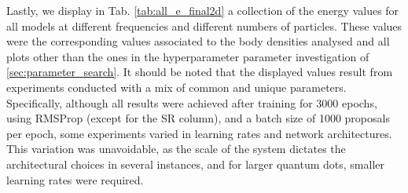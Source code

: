Lastly, we display in Tab. \ref{tab:all_e_final2d} a collection of the energy values for all models at different frequencies and different numbers of particles. These values were the corresponding values associated to the body densities analysed and all plots other than the ones in the hyperparameter parameter investigation of \ref{sec:parameter_search}. It should be noted that the displayed values result from experiments conducted with a mix of common and unique parameters. Specifically, although all results were achieved after training for 3000 epochs, using RMSProp (except for the SR column), and a batch size of 1000 proposals per epoch, some experiments varied in learning rates and network architectures. This variation was unavoidable, as the scale of the system dictates the architectural choices in several instances, and for larger quantum dots, smaller learning rates were required.

